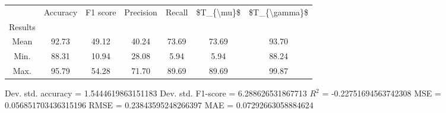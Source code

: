\begin{tabular}{|c|c|c|c|c|c|c|}
\toprule
{} &  Accuracy &  F1 score &  Precision &  Recall &  \$T\_\{\textbackslash mu\}\$ &  \$T\_\{\textbackslash gamma\}\$ \\
Results &           &           &            &         &            &               \\
\hline
Mean    &     92.73 &     49.12 &      40.24 &   73.69 &      73.69 &         93.70 \\
Min.    &     88.31 &     10.94 &      28.08 &    5.94 &       5.94 &         88.24 \\
Max.    &     95.79 &     54.28 &      71.70 &   89.69 &      89.69 &         99.87 \\
\bottomrule
\end{tabular}

 Dev. std. accuracy = 1.5444619863151183
 Dev. std. F1-score = 6.288626531867713
 $R^2$ = -0.22751694563742308
 MSE = 0.056851703436315196
 RMSE = 0.23843595248266397
 MAE = 0.07292663058884624
